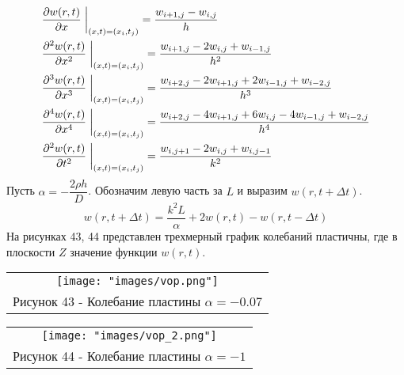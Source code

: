\begin{align}
  &\dfrac{\partial w(r,t)}{\partial x}\;\bigg|_{(x,t)=(x_i,t_j)}=\dfrac{w_{i+1,j}-w_{i,j}}{h}\notag\\
  &\dfrac{\partial^2 w(r,t)}{\partial x^2}\;\bigg|_{(x,t)=(x_i,t_j)}=\dfrac{w_{i+1,j}-2w_{i,j}+w_{i-1,j}}{h^2}\notag\\
  &\dfrac{\partial^3 w(r,t)}{\partial x^3}\;\bigg|_{(x,t)=(x_i,t_j)}=\dfrac{w_{i+2,j}-2w_{i+1,j}+2w_{i-1,j}+w_{i-2,j}}{h^3}\\
  &\dfrac{\partial^4 w(r,t)}{\partial x^4}\;\bigg|_{(x,t)=(x_i,t_j)}=\dfrac{w_{i+2,j}-4w_{i+1,j}+6w_{i,j}-4w_{i-1,j}+w_{i-2,j}}{h^4}\notag\\
  &\dfrac{\partial^2 w(r,t)}{\partial t^2}\;\bigg|_{(x,t)=(x_i,t_j)}=\dfrac{w_{i,j+1}-2w_{i,j}+w_{i,j-1}}{k^2}\notag
\end{align}
Пусть $\alpha=-\dfrac{2\rho h}{D}$. Обозначим левую часть за $L$ и выразим $w(r,t+\Delta t)$.
\begin{equation}
  w(r,t+\Delta t)=\dfrac{k^2L}{\alpha}+2w(r,t)-w(r,t-\Delta t)
\end{equation}
На рисунках 43, 44 представлен трехмерный график колебаний пластичны, где в плоскости $Z$ значение функции $w(r,t)$.
\begin{center}
  \begin{tabular}{c}
  \texttt{[image: "images/vop.png"]}\\
  Рисунок 43 - Колебание пластины $\alpha=-0.07$
\end{tabular}
\end{center}
\begin{center}
  \begin{tabular}{c}
  \texttt{[image: "images/vop\_2.png"]}\\
  Рисунок 44 - Колебание пластины $\alpha=-1$
\end{tabular}
\end{center}


% 
